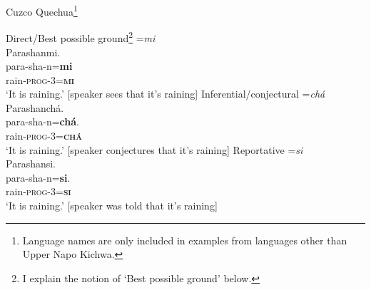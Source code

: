 \documentclass[output=paper]{langscibook}
\begin{document}
\begin{exe}
\ex Cuzco Quechua\footnote{Language names are only included in examples from languages other than Upper Napo Kichwa.}\label{ex:kg1}
\begin{xlist}
	\ex Direct/Best possible ground\footnote{I explain the notion of ‘Best possible ground’ below.} =\textit{mi}\\
		\glll Parashanmi.\\
		para-sha-n=\textbf{mi} \\
		rain-\textsc{prog}-3=\textbf{\textsc{mi}} \\
		\trans ‘It is raining.’ [speaker sees that it’s raining]
	\ex Inferential/conjectural =\textit{chá}\\
		\glll Parashanchá.\\
		para-sha-n=\textbf{chá}.\\
		rain-\textsc{prog}-3=\textbf{\textsc{chá}}\\
		\trans ‘It is raining.’ [speaker conjectures that it’s raining]
	\ex Reportative =\textit{si}\\
		\glll Parashansi.\\
		para-sha-n=\textbf{si}.\\
		rain-\textsc{prog}-3=\textbf{\textsc{si}}\\
        \trans ‘It is raining.’ [speaker was told that it’s raining]
\end{xlist}
\end{exe}
\end{document}
